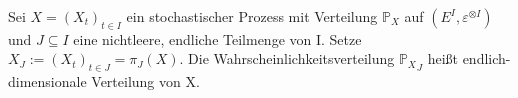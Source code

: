 Sei $X = {(X_{t})}_{t\in I}$ ein stochastischer Prozess mit Verteilung ${\mathbb{P}}_X$ auf $(E^{I},\varepsilon^{ \otimes I})$ und $J \subseteq I$ eine nichtleere, endliche Teilmenge von I. Setze $X_{J} := {(X_{t})}_{t\in J} = \pi_{J}(X)$. Die Wahrscheinlichkeitsverteilung ${{\mathbb{P}}_X}_{J}$ heißt endlich-dimensionale Verteilung von X.